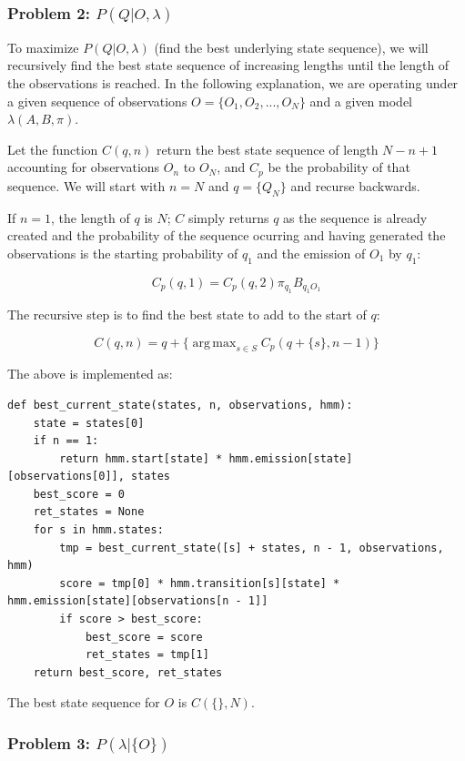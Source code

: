 \documentclass[11pt,a4paper]{article}
\DeclareMathOperator*{\argmax}{arg\,max}
\begin{document}
\subsubsection{Problem 2: $P(Q|O, \lambda)$}
\label{Hidden Markov Models:Problem 2}

To maximize $P(Q|O, \lambda)$ (find the best underlying state sequence), we will recursively find the best state sequence of increasing lengths until the length of the observations is reached. In the following explanation, we are operating under a given sequence of observations $O = \{O_1, O_2, ..., O_N\}$ and a given model $\lambda(A, B, \pi)$.

Let the function $C(q, n)$ return the best state sequence of length $N - n + 1$ accounting for observations $O_n$ to $O_N$, and $C_p$ be the probability of that sequence. We will start with $n = N$ and $q = \{Q_N\}$ and recurse backwards.

If $n = 1$, the length of $q$ is $N$; $C$ simply returns $q$ as the sequence is already created and the probability of the sequence ocurring and having generated the observations is the starting probability of $q_1$ and the emission of $O_1$ by $q_1$:

\[
C_p(q, 1) = C_p(q, 2) \pi_{q_1} B_{{q_1}{O_1}}
\]

The recursive step is to find the best state to add to the start of $q$:

\[
C(q, n) = q + \{\argmax_{s \in S} C_p(q + \{s\}, n - 1)\}
\]

The above is implemented as:

\begin{lstlisting}
def best_current_state(states, n, observations, hmm):
    state = states[0]
    if n == 1:
        return hmm.start[state] * hmm.emission[state][observations[0]], states
    best_score = 0
    ret_states = None
    for s in hmm.states:
        tmp = best_current_state([s] + states, n - 1, observations, hmm)
        score = tmp[0] * hmm.transition[s][state] * hmm.emission[state][observations[n - 1]]
        if score > best_score:
            best_score = score
            ret_states = tmp[1]
    return best_score, ret_states
\end{lstlisting}

The best state sequence for $O$ is $C(\{\}, N)$.

\subsubsection{Problem 3: $P(\lambda|\{O\})$}
\label{Hidden Markov Models:Problem 3}
\end{document}
